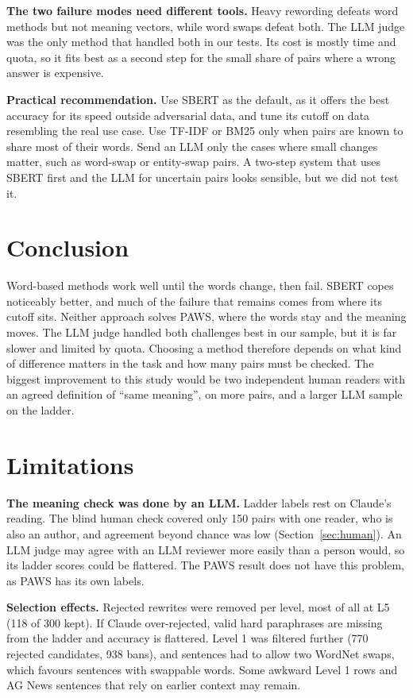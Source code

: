 \documentclass[11pt]{article}
\begin{document}
\textbf{The two failure modes need different tools.} Heavy rewording defeats word methods but not meaning vectors, while word swaps defeat both. The LLM judge was the only method that handled both in our tests. Its cost is mostly time and quota, so it fits best as a second step for the small share of pairs where a wrong answer is expensive.

\textbf{Practical recommendation.} Use SBERT as the default, as it offers the best accuracy for its speed outside adversarial data, and tune its cutoff on data resembling the real use case. Use TF-IDF or BM25 only when pairs are known to share most of their words. Send an LLM only the cases where small changes matter, such as word-swap or entity-swap pairs. A two-step system that uses SBERT first and the LLM for uncertain pairs looks sensible, but we did not test it.

\section{Conclusion}
Word-based methods work well until the words change, then fail. SBERT copes noticeably better, and much of the failure that remains comes from where its cutoff sits. Neither approach solves PAWS, where the words stay and the meaning moves. The LLM judge handled both challenges best in our sample, but it is far slower and limited by quota. Choosing a method therefore depends on what kind of difference matters in the task and how many pairs must be checked. The biggest improvement to this study would be two independent human readers with an agreed definition of “same meaning”, on more pairs, and a larger LLM sample on the ladder.

\section*{Limitations}
\textbf{The meaning check was done by an LLM.} Ladder labels rest on Claude's reading. The blind human check covered only 150 pairs with one reader, who is also an author, and agreement beyond chance was low (Section~\ref{sec:human}). An LLM judge may agree with an LLM reviewer more easily than a person would, so its ladder scores could be flattered. The PAWS result does not have this problem, as PAWS has its own labels.

\textbf{Selection effects.} Rejected rewrites were removed per level, most of all at L5 (118 of 300 kept). If Claude over-rejected, valid hard paraphrases are missing from the ladder and accuracy is flattered. Level 1 was filtered further (770 rejected candidates, 938 bans), and sentences had to allow two WordNet swaps, which favours sentences with swappable words. Some awkward Level 1 rows and AG News sentences that rely on earlier context may remain.
\end{document}

